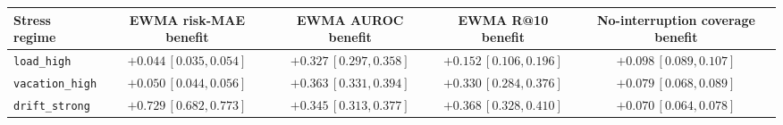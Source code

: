 \begin{tabular}{lcccc}
\toprule
Stress regime & EWMA risk-MAE benefit & EWMA AUROC benefit & EWMA R@10 benefit & No-interruption coverage benefit \\
\midrule
\texttt{load\_high} & \(+0.044\,[0.035,0.054]\) & \(+0.327\,[0.297,0.358]\) & \(+0.152\,[0.106,0.196]\) & \(+0.098\,[0.089,0.107]\) \\
\texttt{vacation\_high} & \(+0.050\,[0.044,0.056]\) & \(+0.363\,[0.331,0.394]\) & \(+0.330\,[0.284,0.376]\) & \(+0.079\,[0.068,0.089]\) \\
\texttt{drift\_strong} & \(+0.729\,[0.682,0.773]\) & \(+0.345\,[0.313,0.377]\) & \(+0.368\,[0.328,0.410]\) & \(+0.070\,[0.064,0.078]\) \\
\bottomrule
\end{tabular}
